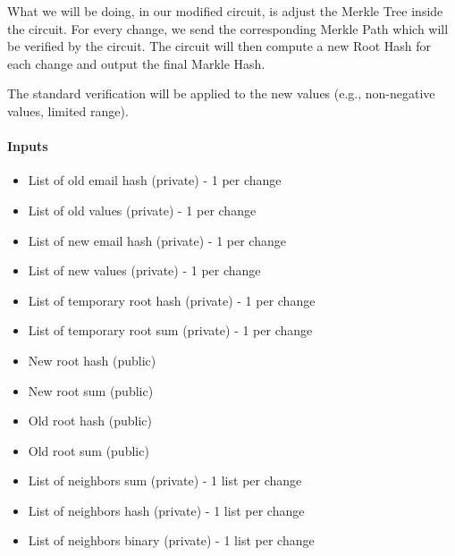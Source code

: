 What we will be doing, in our modified circuit, is adjust the Merkle Tree inside the circuit.
For every change, we send the corresponding Merkle Path which will be verified by the circuit.
The circuit will then compute a new Root Hash for each change and output the final Markle Hash.



The standard verification will be applied to the new values (e.g., non-negative values, limited range).


\paragraph{Inputs}
\begin{itemize}


   \item List of old email hash (private) - 1 per change
  
   \item List of old values (private) - 1 per change


   \item List of new email hash (private) - 1 per change
  
   \item List of new values (private) - 1 per change


   \item List of temporary root hash (private) - 1 per change
  
   \item List of temporary root sum (private) - 1 per change


   \item New root hash (public)


   \item New root sum (public)


   \item Old root hash (public)


   \item Old root sum (public)


   \item List of neighbors sum (private) - 1 list per change


   \item List of neighbors hash (private) - 1 list per change


   \item List of neighbors binary (private) - 1 list per change
  
   \end{itemize}


